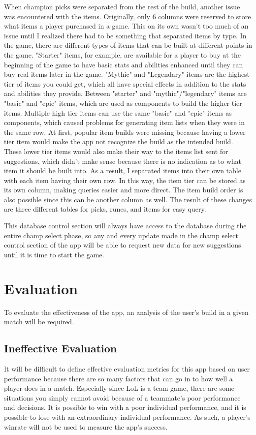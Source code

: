 \documentclass[10pt,twocolumn]{article}
\begin{document}
When champion picks were separated from the rest of the build, another issue was encountered with the items.
Originally, only 6 columns were reserved to store what items a player purchased in a game.
This on its own wasn't too much of an issue until I realized there had to be something that separated items by type.
In the game, there are different types of items that can be built at different points in the game.
"Starter" items, for example, are available for a player to buy at the beginning of the game to have basic stats and abilities enhanced until they can buy real items later in the game.
"Mythic" and "Legendary" items are the highest tier of items you could get, which all have special effects in addition to the stats and abilities they provide. 
Between "starter" and "mythic"/"legendary" items are "basic" and "epic" items, which are used as components to build the higher tier items. 
Multiple high tier items can use the same "basic" and "epic" items as components, which caused problems for generating item lists when they were in the same row.
At first, popular item builds were missing because having a lower tier item would make the app not recognize the build as the intended build.
These lower tier items would also make their way to the items list sent for suggestions, which didn't make sense because there is no indication as to what item it should be built into.
As a result, I separated items into their own table with each item having their own row.
In this way, the item tier can be stored as its own column, making queries easier and more direct.
The item build order is also possible since this can be another column as well.
The result of these changes are three different tables for picks, runes, and items for easy query. 

This database control section will always have access to the database during the entire champ select phase, so any and every update made in the champ select control section of the app will be able to request new data for new suggestions until it is time to start the game.

\section{Evaluation}
To evaluate the effectiveness of the app, an analysis of the user's build in a given match will be required.

\subsection{Ineffective Evaluation}
It will be difficult to define effective evaluation metrics for this app based on user performance because there are so many factors that can go in to how well a player does in a match.
Especially since LoL is a team game, there are some situations you simply cannot avoid because of a teammate's poor performance and decisions.
It is possible to win with a poor individual performance, and it is possible to lose with an extraordinary individual performance.
As such, a player's winrate will not be used to measure the app's success.
\end{document}
